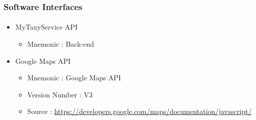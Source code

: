 \subsubsection{Software Interfaces}
\label{subs:softwareinterfaces}


\paragraph{}

\begin{itemize}
	\item MyTaxyService API
	\begin{itemize}
		\item Mnemonic : Back-end
	\end{itemize}
	\item Google Maps API
	\begin{itemize}
		\item Mnemonic : Google Maps API
		\item Version Number : V3
		\item Source : \url{https://developers.google.com/maps/documentation/javascript/} 
	\end{itemize}

\end{itemize}

